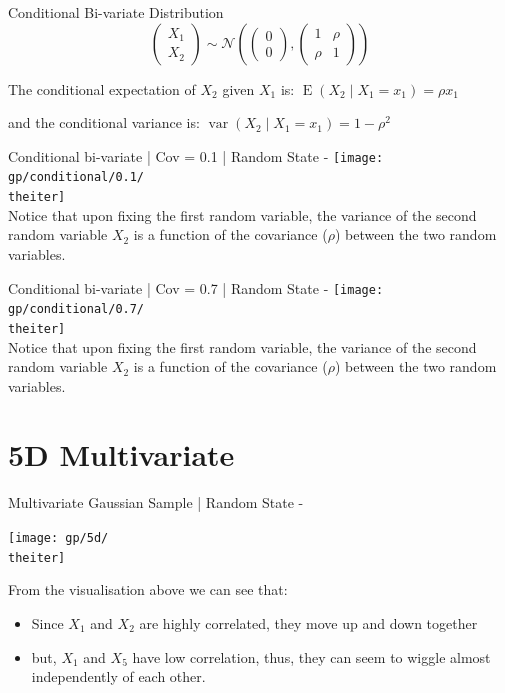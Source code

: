 \documentclass{beamer}
\begin{document}
\begin{frame}{Conditional Bi-variate Distribution}
$$
\begin{pmatrix}
	X_1 \\
	X_2
\end{pmatrix}  \sim \mathcal{N} \left( \begin{pmatrix}
	0 \\
	0
\end{pmatrix} , \begin{pmatrix}
	1 & \rho \\
	\rho & 1
\end{pmatrix} \right)
$$

The conditional expectation of $X_2$ given $X_1$ is: $\operatorname{E}(X_2 \mid X_1=x_1)= \rho x_1$

and the conditional variance is: $\operatorname{var}(X_2 \mid X_1 = x_1) = 1-\rho^2$
\end{frame}

%
{%
	\begin{frame}{Conditional bi-variate | Cov = 0.1 | Random State - \theiter}
		\texttt{[image: gp/conditional/0.1/\\theiter]}\\
		Notice that upon fixing the first random variable, the variance of the second random variable $X_2$ is a function of the covariance ($\rho$) between the two random variables.
	\end{frame}
}

%
{%
	\begin{frame}{Conditional bi-variate | Cov = 0.7 | Random State - \theiter}
		\texttt{[image: gp/conditional/0.7/\\theiter]}\\
		Notice that upon fixing the first random variable, the variance of the second random variable $X_2$ is a function of the covariance ($\rho$) between the two random variables.
	\end{frame}
}

\section{5D Multivariate}

%
{%
	\begin{frame}{Multivariate Gaussian Sample | Random State - \theiter}
		\begin{center}
			\texttt{[image: gp/5d/\\theiter]}
		\end{center}
		From the visualisation above we can see that:
		\begin{itemize}
			\item Since $X_1$ and $X_2$ are highly correlated, they move up and down together
			\item but, $X_1$ and $X_5$ have low correlation, thus, they can seem to wiggle almost independently of each other.
		\end{itemize}
	\end{frame}
}
\end{document}
